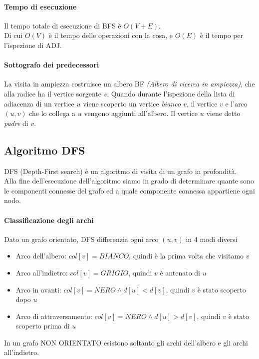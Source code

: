 \documentclass[12pt, a4paper, openany]{book}
\begin{document}
\paragraph*{Tempo di esecuzione}
Il tempo totale di esecuzione di BFS è $O(V + E)$.\\
Di cui $O(V)$ è il tempo delle operazioni con la cosa, e $O(E)$ è il tempo per l'ispezione di ADJ.

\paragraph{Sottografo dei predecessori}
La visita in ampiezza costruisce un albero BF \emph{(Albero di ricerca in ampiezza)}, che alla radice ha il vertice sorgente $s$.
Quando durante l'ispezione della lista di adiacenza di un vertice $u$ viene scoperto un vertice \emph{ bianco $v$},
il vertice $v$ e l'arco $(u,v)$ che lo collega a $u$ vengono aggiunti all'albero.
Il vertice $u$ viene detto \emph{padre} di $v$.


\subsection{Algoritmo DFS}
DFS (Depth-First search) è un algoritmo di visita di un grafo in profondità.
\\Alla fine dell'esecuzione dell'algoritmo siamo in grado di determinare quante sono le componenti connesse
del grafo ed a quale componente connessa appartiene ogni nodo.

\paragraph{Classificazione degli archi}
Dato un grafo orientato, DFS differenzia ogni arco $(u,v)$ in 4 modi diversi
\begin{itemize}
	\item Arco dell'albero: $col[v] = BIANCO$, quindi è la prima volta che visitamo $v$
	\item Arco all'indietro: $col[v] = GRIGIO$, quindi $v$ è antenato di $u$
	\item Arco in avanti: $col[v] = NERO \land d[u] < d[v]$, quindi $v$ è stato scoperto dopo $u$
	\item Arco di attraversamento: $col[v] = NERO \land d[u] > d[v]$, quindi $v$ è stato scoperto prima di $u$
\end{itemize}
In un grafo NON ORIENTATO esistono soltanto gli archi dell'albero e gli archi all'indietro.
\end{document}
